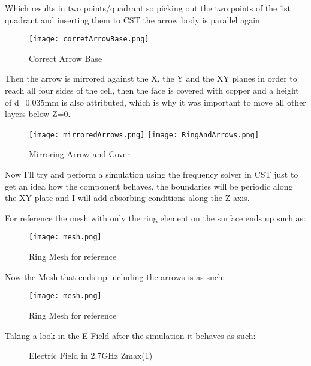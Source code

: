         Which results in two points/quadrant so picking out the two points of the 1st quadrant and 
        inserting them to CST the arrow body is parallel again 
        \begin{figure}[h]
            \centering
            \texttt{[image: corretArrowBase.png]}
            \caption{Correct Arrow Base}
            \label{img:corretArrowBase}
        \end{figure}

        Then the arrow is mirrored against the X, the Y and the XY planes in order to reach all four 
        sides of the cell, then the face is covered with copper and a height of d=0.035mm is also 
        attributed, which is why it was important to move all other layers below Z=0. 
        \begin{figure}[h]
            \centering
            \texttt{[image: mirroredArrows.png]}\hfil
            \texttt{[image: RingAndArrows.png]}
            \caption{Mirroring Arrow and Cover}
            \label{img:mirrorAndCover}
        \end{figure}
        

        Now I'll try and perform a simulation using the frequency solver in CST just to get an idea 
        how the component behaves, the boundaries will be periodic along the XY plate and I will add
        absorbing conditions along the Z axis.

        For reference the mesh with only the ring element on the surface ends up such as: 
        
        \begin{figure}[h]
            \centering
            \texttt{[image: mesh.png]}
            \caption{Ring Mesh for reference}
            \label{img:ringMesh}
        \end{figure}

        Now the Mesh that ends up including the arrows is as such:
        \begin{figure}[h]
            \centering
            \texttt{[image: mesh.png]}
            \caption{Ring Mesh for reference}
            \label{img:RingAndArrowMesh}
        \end{figure}

        Taking a look in the E-Field after the simulation it behaves as such:
        \begin{figure}[h]
            \centering
            \caption{Electric Field in 2.7GHz Zmax(1)}
            \label{img:E_2.7_Zmax1}
        \end{figure}
        

